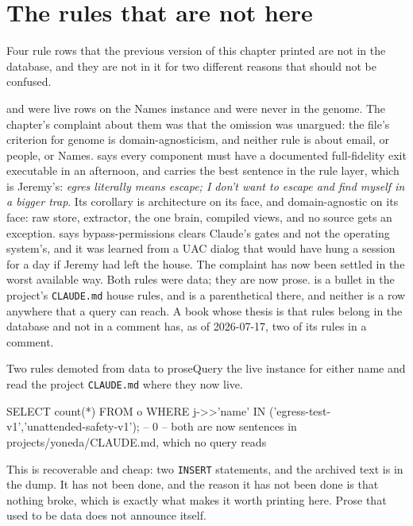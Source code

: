 \section{The rules that are not here}

Four rule rows that the previous version of this chapter printed are not in the database, and they are not in it for two different reasons that should not be confused.

 and  were live rows on the Names instance and were never in the genome. The chapter's complaint about them was that the omission was unargued: the file's criterion for genome is domain-agnosticism, and neither rule is about email, or people, or Names.  says every component must have a documented full-fidelity exit executable in an afternoon, and carries the best sentence in the rule layer, which is Jeremy's: \emph{egres literally means escape; I don't want to escape and find myself in a bigger trap}. Its corollary is architecture on its face, and domain-agnostic on its face: raw store, extractor, the one brain, compiled views, and no source gets an exception.  says bypass-permissions clears Claude's gates and not the operating system's, and it was learned from a UAC dialog that would have hung a session for a day if Jeremy had left the house. The complaint has now been settled in the worst available way. Both rules were data; they are now prose.  is a bullet in the project's \texttt{CLAUDE.md} house rules, and  is a parenthetical there, and neither is a row anywhere that a query can reach. A book whose thesis is that rules belong in the database and not in a comment has, as of 2026-07-17, two of its rules in a comment.

\begin{Correspondence}{Two rules demoted from data to prose}{Query the live instance for either name and read the project \texttt{CLAUDE.md} where they now live.}
\begin{Check}
SELECT count(*) FROM o WHERE j->>'name' IN ('egress-test-v1','unattended-safety-v1');
-- 0
-- both are now sentences in projects/yoneda/CLAUDE.md, which no query reads
\end{Check}
This is recoverable and cheap: two \texttt{INSERT} statements, and the archived text is in the dump. It has not been done, and the reason it has not been done is that nothing broke, which is exactly what makes it worth printing here. Prose that used to be data does not announce itself.
\end{Correspondence}

